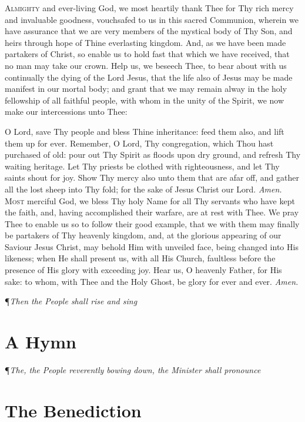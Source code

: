 \lettrine{A}{lmighty} and ever-living God, we most heartily thank Thee for Thy rich mercy and invaluable goodness, vouchsafed to us in this sacred Communion, wherein we have assurance that we are very members of the mystical body of Thy Son, and heirs through hope of Thine everlasting kingdom.
And, as we have been made partakers of Christ, so enable us to hold fast that which we have received, that no man may take our crown.
Help us, we beseech Thee, to bear about with us continually the dying of the Lord Jesus, that the life also of Jesus may be made manifest in our mortal body; and grant that we may remain alway in the holy fellowship of all faithful people, with whom in the unity of the Spirit, we now make our intercessions unto Thee:

O Lord, save Thy people and bless Thine inheritance: feed them also, and lift them up for ever.
Remember, O Lord, Thy congregation, which Thou hast purchased of old: pour out Thy Spirit as floods upon dry ground, and refresh Thy waiting heritage.
Let Thy priests be clothed with righteousness, and let Thy saints shout for joy.
Show Thy mercy also unto them that are afar off, and gather all the lost sheep into Thy fold; for the sake of Jesus Christ our Lord.
\textit{Amen.} \\

\lettrine{M}{ost} merciful God, we bless Thy holy Name for all Thy servants who have kept the faith, and, having accomplished their warfare, are at rest with Thee.
We pray Thee to enable us so to follow their good example, that we with them may finally be partakers of Thy heavenly kingdom, and, at the glorious appearing of our Saviour Jesus Christ, may behold Him with unveiled face, being changed into His likeness; when He shall present us, with all His Church, faultless before the presence of His glory with exceeding joy.
Hear us, O heavenly Father, for His sake: to whom, with Thee and the Holy Ghost, be glory for ever and ever.
\textit{Amen.} \\

{\centering \P\textit{Then the People shall rise and sing}\par}

\section*{A Hymn}

\noindent\P\textit{The, the People reverently bowing down, the Minister shall pronounce}

\section*{The Benediction}

